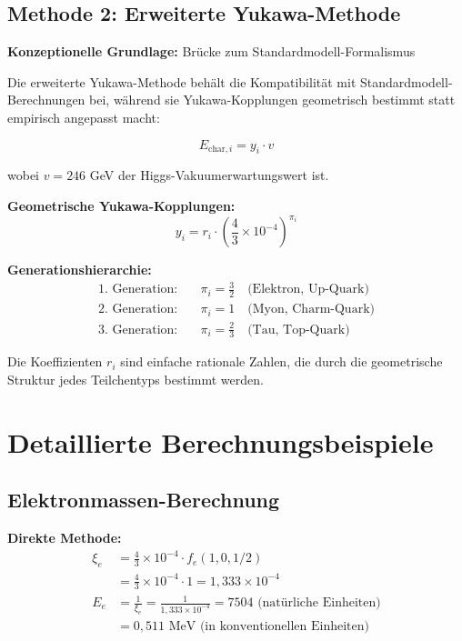 \documentclass[12pt,a4paper]{report}
\begin{document}
\subsection{Methode 2: Erweiterte Yukawa-Methode}
\label{subsec:extended_yukawa_method}

\textbf{Konzeptionelle Grundlage:} Brücke zum Standardmodell-Formalismus

Die erweiterte Yukawa-Methode behält die Kompatibilität mit Standardmodell-Berechnungen bei, während sie Yukawa-Kopplungen geometrisch bestimmt statt empirisch angepasst macht:

\begin{equation}
	E_{\text{char},i} = y_i \cdot v
	\label{eq:yukawa_mass_formula}
\end{equation}

wobei $v = 246$ GeV der Higgs-Vakuumerwartungswert ist.

\textbf{Geometrische Yukawa-Kopplungen:}
\begin{equation}
	\boxed{y_i = r_i \cdot \left(\frac{4}{3} \times 10^{-4}\right)^{\pi_i}}
	\label{eq:geometric_yukawa}
\end{equation}

\textbf{Generationshierarchie:}
\begin{align}
	\text{1. Generation:} \quad &\pi_i = \frac{3}{2} \quad \text{(Elektron, Up-Quark)} \\
	\text{2. Generation:} \quad &\pi_i = 1 \quad \text{(Myon, Charm-Quark)} \\
	\text{3. Generation:} \quad &\pi_i = \frac{2}{3} \quad \text{(Tau, Top-Quark)}
\end{align}

Die Koeffizienten $r_i$ sind einfache rationale Zahlen, die durch die geometrische Struktur jedes Teilchentyps bestimmt werden.

\section{Detaillierte Berechnungsbeispiele}
\label{sec:calculation_examples}

\subsection{Elektronmassen-Berechnung}
\label{subsec:electron_calculation}

\textbf{Direkte Methode:}
\begin{align}
	\xi_e &= \frac{4}{3} \times 10^{-4} \cdot f_e(1,0,1/2) \\
	&= \frac{4}{3} \times 10^{-4} \cdot 1 = 1,333 \times 10^{-4} \\
	E_{e} &= \frac{1}{\xi_e} = \frac{1}{1,333 \times 10^{-4}} = 7504 \text{ (natürliche Einheiten)} \\
	&= 0,511 \text{ MeV (in konventionellen Einheiten)}
\end{align}
\end{document}
